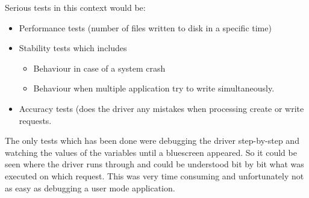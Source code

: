 Serious tests in this context would be:
\begin{itemize}
\item Performance tests (number of files written to disk in a specific time)
\item Stability tests which includes
	\begin{itemize}
	\item Behaviour in case of a system crash
	\item Behaviour when multiple application try to write simultaneously.
	\end{itemize}
\item Accuracy tests (does the driver any mistakes when processing create or write requests.
\end{itemize}

The only tests which has been done were debugging the driver step-by-step and watching the values of the variables until a bluescreen appeared. So it could be seen where the driver runs through and could be understood bit by bit what was executed on which request. This was very time consuming and unfortunately not as easy as debugging a user mode application.